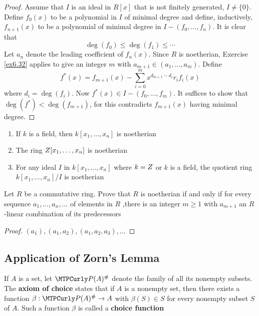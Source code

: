 \documentclass[11pt]{article}
\begin{document}
\begin{proof}
Assume that \(I\) is an ideal in \(R[x]\) that is not finitely generated,
\(I\neq\{0\}\). Define \(f_0(x)\) to be a polynomial in \(I\) of minimal degree
and define, inductively, \(f_{n+1}(x)\) to be a polynomial of minimal degree
in \(I-(f_0,\dots,f_n)\). It is clear that 
\begin{equation*}
\deg(f_0)\le\deg(f_1)\le\cdots
\end{equation*}
Let \(a_n\) denote the leading coefficient of \(f_n(x)\). Since \(R\) is
noetherian, Exercise \ref{ex6.32} applies to give an integer \(m\) with
\(a_{m+1}\in(a_1,\dots,a_m)\). Define
\begin{equation*}
f^*(x)=f_{m+1}(x)-\displaystyle\sum_{i=0}^mx^{d_{m+1}-d_i}r_if_i(x)
\end{equation*}
where \(d_i=\deg(f_i)\). Now \(f^*(x)\in I-(f_0,\dots,f_m)\). It suffices to
show that \(\deg(f^*)<\deg(f_{m+1})\), for this contradicts \(f_{m+1}(x)\)
having minimal degree.
\end{proof}

\begin{corollary}[]
\begin{enumerate}
\item If \(k\) is a field, then \(k[x_1,\dots,x_n]\) is noetherian
\item The ring \(\relax{Z}[x_1,\dots,x_n]\) is noetherian
\item For any ideal \(I\) in \(k[x_1,\dots,x_n]\) where \(k=\relax{Z}\) or \(k\) is a
field, the quotient ring \(k[x_1,\dots,x_n]/I\) is noetherian
\end{enumerate}
\end{corollary}

\begin{exercise}
\label{ex6.32}
Let \(R\) be a commutative ring. Prove that \(R\) is noetherian if and only if
for every sequence \(a_1,\dots,a_n,\dots\) of elements in \(R\) ,there is an
integer \(m\ge1\) with \(a_{m+1}\) an \(R\)-linear combination of its predecessors
\end{exercise}

\begin{proof}
\((a_1),(a_1,a_2),(a_1,a_2,a_3),\dots\)
\end{proof}
\subsection{Application of Zorn's Lemma}
\label{sec:org45101b4}
\begin{definition}[]
If \(A\) is a set, let \(\calp(A)^\#\) denote the family of all its nonempty
subsets. The \textbf{axiom of choice} states that if \(A\) is a nonempty set, then there
exists a function \(\beta:\calp(A)^\#\to A\) with \(\beta(S)\in S\) for every nonempty
subset \(S\) of \(A\). Such a function \(\beta\) is called a \textbf{choice function}
\end{definition}
\end{document}
